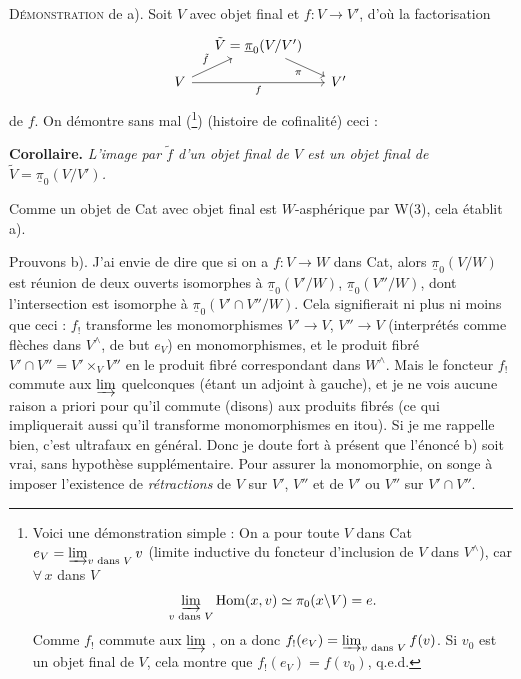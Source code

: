\documentclass[11pt]{article}
\newcommand{\msp}[1]{\marginpar{\footnotesize [#1]}}
\newcommand{\Hom}{\mathrm{Hom}}
\newcommand{\upi}{\underline{\pi}}
\begin{document}
\noindent\textsc{Démonstration} de a). Soit $V$ avec objet final et $f : V \longrightarrow V'$, d'où la factorisation
\[
\begin{tikzcd}[column sep=small, row sep=small]
 & \tilde{V} = \upi_0(V/V') \arrow[dr, "\pi"'] & \\
V \arrow[ur, "\tilde{f}"] \arrow[rr, "f"'] & & V'
\end{tikzcd}
\]
de $f$. On démontre sans mal (\footnote{Voici une démonstration simple : On a pour toute $V$ dans Cat $e_V = \varinjlim_{v \text{ dans } V} v$ (limite inductive du foncteur d'inclusion de $V$ dans $V^\wedge$), car $\forall\, x$ dans $V$
\[
\varinjlim_{v \text{ dans } V} \Hom(x,v) \simeq \pi_0(x\backslash V) = e.
\]
Comme $f_!$ commute aux $\varinjlim$ , on a donc $f_!(e_V) = \varinjlim_{v \text{ dans } V} f(v)$. Si $v_0$ est un objet final de $V$, cela montre que $f_!(e_V) = f(v_0)$, q.e.d.}) (histoire de cofinalité) ceci :

\noindent\textbf{Corollaire.} \textit{L'image par $\tilde{f}$ d'un objet final de $V$ est un objet final de $\tilde{V} = \upi_0(V/V')$.}

Comme un objet de Cat avec objet final est $W$-asphérique par W(3), cela établit a).

Prouvons b). J'ai envie de dire que si on a $f : V \longrightarrow W$ dans Cat, alors $\upi_0(V/W)$ est réunion de deux ouverts isomorphes à $\upi_0(V'/W)$, $\upi_0(V''/W)$, dont l'intersection est isomorphe à $\upi_0(V'\cap V''/W)$. Cela signifierait ni plus ni
\msp{page 98}
moins que ceci : $f_!$ transforme les monomorphismes $V' \longrightarrow V$, $V'' \longrightarrow V$ (interprétés comme flèches dans $V^\wedge$, de but $e_V$) en monomorphismes, et le produit fibré $V'\cap V'' = V' \times_V V''$ en le produit fibré correspondant dans $W^\wedge$. Mais le foncteur $f_!$ commute aux $\varinjlim$ quelconques (étant un adjoint à gauche), et je ne vois aucune raison a priori pour qu'il commute (disons) aux produits fibrés (ce qui impliquerait aussi qu'il transforme monomorphismes en itou). Si je me rappelle bien, c'est ultrafaux en général. Donc je doute fort à présent que l'énoncé b) soit vrai, sans hypothèse supplémentaire. Pour assurer la monomorphie, on songe à imposer l'existence de \textit{rétractions} de $V$ sur $V'$, $V''$ et de $V'$ ou $V''$ sur $V'\cap V''$.
\end{document}
